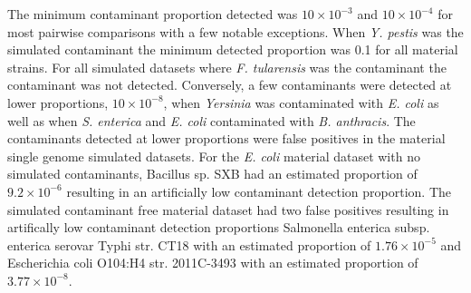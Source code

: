 \documentclass[fleqn,10pt,lineno]{wlpeerj}\usepackage[]{graphicx}\usepackage[]{color}
\begin{document}


The minimum contaminant proportion detected was $10 \times 10^{-3}$ and  $10 \times 10^{-4}$ for most pairwise comparisons with a few notable exceptions. 
When \textit{Y. pestis} was the simulated contaminant the minimum detected proportion was 0.1 for all material strains. 
For all simulated datasets where \textit{F. tularensis} was the contaminant the contaminant was not detected.
Conversely, a few contaminants were detected at lower proportions, $10 \times 10^{-8}$, when \textit{Yersinia} was contaminated with \textit{E. coli} as well as when \textit{S. enterica} and \textit{E. coli} contaminated with \textit{B. anthracis}. 
The contaminants detected at lower proportions were false positives in the material single genome simulated datasets. 
For the \textit{E. coli} material dataset with no simulated contaminants, Bacillus sp. SXB had an estimated proportion of \ensuremath{9.2\times 10^{-6}} resulting in an artificially low contaminant detection proportion. 
The simulated contaminant free  material dataset had two false positives resulting in artifically low contaminant detection proportions Salmonella enterica subsp. enterica serovar Typhi str. CT18 with an estimated proportion of \ensuremath{1.76\times 10^{-5}} and Escherichia coli O104:H4 str. 2011C-3493 with an estimated proportion of \ensuremath{3.77\times 10^{-8}}.
\end{document}
